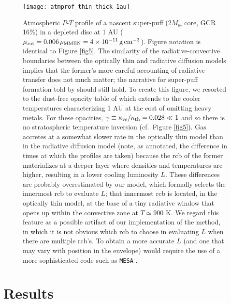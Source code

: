 \documentclass[fleqn,useAMS,usenatbib]{mnras}
\begin{document}
\begin{figure}
    \centering
    \texttt{[image: atmprof\_thin\_thick\_1au]}
    \caption{Atmospheric $P$-$T$ profile of a nascent super-puff
    ($2 M_\oplus$ core, GCR = 16\%) in a depleted disc at 1 AU
    ($\rho_{\rm out} = 0.006 \,\rho_{\rm MMEN} =
    4 \times 10^{-11} \, {\rm g\,cm^{-3}}$).
    Figure notation is identical to Figure \ref{fig5}.
    The similarity of the radiative-convective boundaries
    between the optically thin and radiative diffusion
    models implies that the former's more careful accounting of 
    radiative transfer does not much matter; the narrative for
    super-puff formation told by \citet{paper3} should still hold.
    To create this figure, we resorted to the dust-free opacity table of
    \citet{freedman14} which extends to the cooler temperatures
    characterizing 1 AU at the cost of omitting heavy metals.
    For these opacities,
    $\gamma \equiv \kappa_{\rm vs}/\kappa_{\rm th} = 0.028 \ll 1$
    and so there is no stratospheric temperature inversion
    (cf.~Figure \ref{fig5}). Gas accretes at a somewhat slower 
    rate in the optically thin model than in the radiative diffusion
    model (note, as annotated, the difference in times
    at which the profiles are taken) 
    because the rcb of the former materializes at a deeper layer
    where densities and temperatures are higher,
    resulting in a lower cooling luminosity $L$. 
    These differences are probably overestimated by our model, which
    formally selects the innermost rcb to evaluate $L$;
    that innermost rcb is located, in the optically thin model, at the
    base of a tiny radiative window
    that opens up within the convective zone at $T \simeq 900$ K.
    We regard this feature as a possible artifact of our implementation
    of the \citet{piso14} method, in which it is not obvious which
    rcb to choose in evaluating $L$ when there are multiple rcb's.
    To obtain a more accurate $L$ (and one that may vary with position
    in the envelope) would require the use of a
    more sophisticated code such as \texttt{MESA} \citep{paxton11}.}
    \label{fig6}
\end{figure}

\section{Results}
\label{sec:result}
\end{document}
